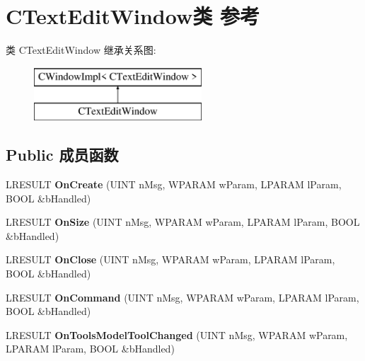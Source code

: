 \hypertarget{class_c_text_edit_window}{}\section{C\+Text\+Edit\+Window类 参考}
\label{class_c_text_edit_window}
类 C\+Text\+Edit\+Window 继承关系图\+:\begin{figure}[H]
\begin{center}
\leavevmode
\includegraphics[height=2.000000cm]{class_c_text_edit_window}
\end{center}
\end{figure}
\subsection*{Public 成员函数}
\begin{DoxyCompactItemize}
\item 
\mbox{\label{class_c_text_edit_window_a52e54914048515c81959a10367cd81b4}} 
L\+R\+E\+S\+U\+LT {\bfseries On\+Create} (U\+I\+NT n\+Msg, W\+P\+A\+R\+AM w\+Param, L\+P\+A\+R\+AM l\+Param, B\+O\+OL \&b\+Handled)
\item 
\mbox{\label{class_c_text_edit_window_af935897dd3c57a66441b0e71ae8331fc}} 
L\+R\+E\+S\+U\+LT {\bfseries On\+Size} (U\+I\+NT n\+Msg, W\+P\+A\+R\+AM w\+Param, L\+P\+A\+R\+AM l\+Param, B\+O\+OL \&b\+Handled)
\item 
\mbox{\label{class_c_text_edit_window_a25cf541a139ce2149af03b720d042efa}} 
L\+R\+E\+S\+U\+LT {\bfseries On\+Close} (U\+I\+NT n\+Msg, W\+P\+A\+R\+AM w\+Param, L\+P\+A\+R\+AM l\+Param, B\+O\+OL \&b\+Handled)
\item 
\mbox{\label{class_c_text_edit_window_aac7ccde8503269f620b80b31b0fe0d9f}} 
L\+R\+E\+S\+U\+LT {\bfseries On\+Command} (U\+I\+NT n\+Msg, W\+P\+A\+R\+AM w\+Param, L\+P\+A\+R\+AM l\+Param, B\+O\+OL \&b\+Handled)
\item 
\mbox{\label{class_c_text_edit_window_a650589332049a32cf790bb362aa64a31}} 
L\+R\+E\+S\+U\+LT {\bfseries On\+Tools\+Model\+Tool\+Changed} (U\+I\+NT n\+Msg, W\+P\+A\+R\+AM w\+Param, L\+P\+A\+R\+AM l\+Param, B\+O\+OL \&b\+Handled)
\end{DoxyCompactItemize}
